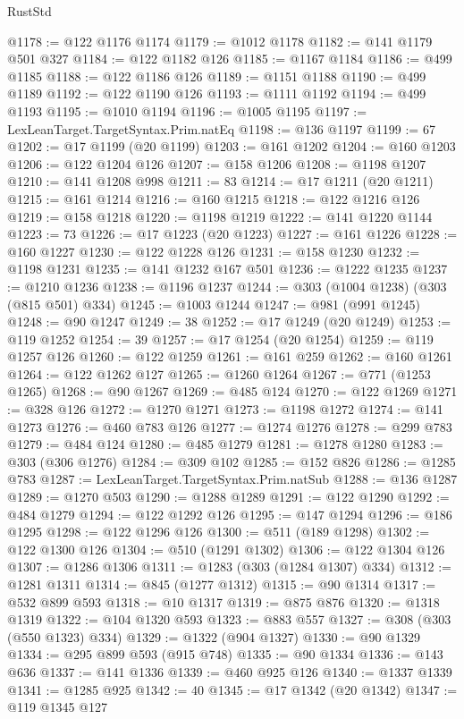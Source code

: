 \begin{lexlean}{RustStd}
\begin{coremodule}
@1178 := @122 @1176 @1174
@1179 := @1012 @1178
@1182 := @141 @1179 @501 @327
@1184 := @122 @1182 @126
@1185 := @1167 @1184
@1186 := @499 @1185
@1188 := @122 @1186 @126
@1189 := @1151 @1188
@1190 := @499 @1189
@1192 := @122 @1190 @126
@1193 := @1111 @1192
@1194 := @499 @1193
@1195 := @1010 @1194
@1196 := @1005 @1195
@1197 := LexLeanTarget.TargetSyntax.Prim.natEq
@1198 := @136 @1197
@1199 := 67
@1202 := @17 @1199 (@20 @1199)
@1203 := @161 @1202
@1204 := @160 @1203
@1206 := @122 @1204 @126
@1207 := @158 @1206
@1208 := @1198 @1207
@1210 := @141 @1208 @998
@1211 := 83
@1214 := @17 @1211 (@20 @1211)
@1215 := @161 @1214
@1216 := @160 @1215
@1218 := @122 @1216 @126
@1219 := @158 @1218
@1220 := @1198 @1219
@1222 := @141 @1220 @1144
@1223 := 73
@1226 := @17 @1223 (@20 @1223)
@1227 := @161 @1226
@1228 := @160 @1227
@1230 := @122 @1228 @126
@1231 := @158 @1230
@1232 := @1198 @1231
@1235 := @141 @1232 @167 @501
@1236 := @1222 @1235
@1237 := @1210 @1236
@1238 := @1196 @1237
@1244 := @303 (@1004 @1238) (@303 (@815 @501) @334)
@1245 := @1003 @1244
@1247 := @981 (@991 @1245)
@1248 := @90 @1247
@1249 := 38
@1252 := @17 @1249 (@20 @1249)
@1253 := @119 @1252
@1254 := 39
@1257 := @17 @1254 (@20 @1254)
@1259 := @119 @1257 @126
@1260 := @122 @1259
@1261 := @161 @259
@1262 := @160 @1261
@1264 := @122 @1262 @127
@1265 := @1260 @1264
@1267 := @771 (@1253 @1265)
@1268 := @90 @1267
@1269 := @485 @124
@1270 := @122 @1269
@1271 := @328 @126
@1272 := @1270 @1271
@1273 := @1198 @1272
@1274 := @141 @1273
@1276 := @460 @783 @126
@1277 := @1274 @1276
@1278 := @299 @783
@1279 := @484 @124
@1280 := @485 @1279
@1281 := @1278 @1280
@1283 := @303 (@306 @1276)
@1284 := @309 @102
@1285 := @152 @826
@1286 := @1285 @783
@1287 := LexLeanTarget.TargetSyntax.Prim.natSub
@1288 := @136 @1287
@1289 := @1270 @503
@1290 := @1288 @1289
@1291 := @122 @1290
@1292 := @484 @1279
@1294 := @122 @1292 @126
@1295 := @147 @1294
@1296 := @186 @1295
@1298 := @122 @1296 @126
@1300 := @511 (@189 @1298)
@1302 := @122 @1300 @126
@1304 := @510 (@1291 @1302)
@1306 := @122 @1304 @126
@1307 := @1286 @1306
@1311 := @1283 (@303 (@1284 @1307) @334)
@1312 := @1281 @1311
@1314 := @845 (@1277 @1312)
@1315 := @90 @1314
@1317 := @532 @899 @593
@1318 := @10 @1317
@1319 := @875 @876
@1320 := @1318 @1319
@1322 := @104 @1320 @593
@1323 := @883 @557
@1327 := @308 (@303 (@550 @1323) @334)
@1329 := @1322 (@904 @1327)
@1330 := @90 @1329
@1334 := @295 @899 @593 (@915 @748)
@1335 := @90 @1334
@1336 := @143 @636
@1337 := @141 @1336
@1339 := @460 @925 @126
@1340 := @1337 @1339
@1341 := @1285 @925
@1342 := 40
@1345 := @17 @1342 (@20 @1342)
@1347 := @119 @1345 @127

\end{coremodule}
\end{lexlean}
